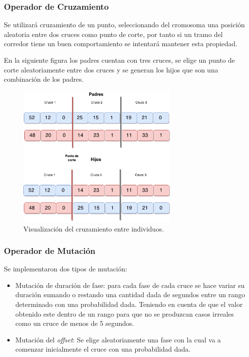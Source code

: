 \subsubsection{Operador de Cruzamiento}
Se  utilizará cruzamiento de un punto, seleccionando del cromosoma una posición aleatoria entre dos cruces como punto de corte, por tanto si un tramo del corredor tiene un buen comportamiento se intentará mantener esta propiedad.

En la siguiente figura los padres cuentan con tres cruces, se elige un punto de corte aleatoriamente entre dos cruces y se generan los hijos que son una combinación de los padres.

\begin{figure}[H]
	\centering
	\includegraphics[width=8cm]{Figures/alg_cruzamiento}
	\caption{Visualización del cruzamiento entre individuos.}
	\label{fig:op_cruzamiento}
\end{figure}



\subsubsection{Operador de Mutación}
Se implementaron dos tipos de mutación:
\begin{itemize}

\item Mutación de duración de fase: para cada fase de cada cruce se hace variar su duración sumando o restando una cantidad dada de segundos entre un rango determinado con una probabilidad dada. Teniendo en cuenta de que el valor obtenido este dentro de un rango para que no se produzcan casos irreales como un cruce de menos de 5 segundos.

\item Mutación del \emph{offset}: Se elige aleatoriamente una fase con la cual va a comenzar inicialmente el cruce con una probabilidad dada.
\end{itemize}

